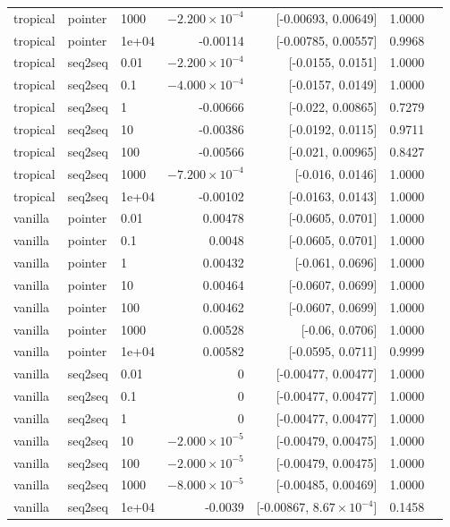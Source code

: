 \documentclass[10pt]{article}
\begin{document}
{\begin{longtable}{lllrrrl}
tropical & pointer & 1000 & $-2.200\times10^{-4}$ & [-0.00693, 0.00649] & 1.0000 & \\
tropical & pointer & 1e+04 & -0.00114 & [-0.00785, 0.00557] & 0.9968 & \\
tropical & seq2seq & 0.01 & $-2.200\times10^{-4}$ & [-0.0155, 0.0151] & 1.0000 & \\
tropical & seq2seq & 0.1 & $-4.000\times10^{-4}$ & [-0.0157, 0.0149] & 1.0000 & \\
tropical & seq2seq & 1 & -0.00666 & [-0.022, 0.00865] & 0.7279 & \\
tropical & seq2seq & 10 & -0.00386 & [-0.0192, 0.0115] & 0.9711 & \\
tropical & seq2seq & 100 & -0.00566 & [-0.021, 0.00965] & 0.8427 & \\
tropical & seq2seq & 1000 & $-7.200\times10^{-4}$ & [-0.016, 0.0146] & 1.0000 & \\
tropical & seq2seq & 1e+04 & -0.00102 & [-0.0163, 0.0143] & 1.0000 & \\
vanilla & pointer & 0.01 & 0.00478 & [-0.0605, 0.0701] & 1.0000 & \\
vanilla & pointer & 0.1 & 0.0048 & [-0.0605, 0.0701] & 1.0000 & \\
vanilla & pointer & 1 & 0.00432 & [-0.061, 0.0696] & 1.0000 & \\
vanilla & pointer & 10 & 0.00464 & [-0.0607, 0.0699] & 1.0000 & \\
vanilla & pointer & 100 & 0.00462 & [-0.0607, 0.0699] & 1.0000 & \\
vanilla & pointer & 1000 & 0.00528 & [-0.06, 0.0706] & 1.0000 & \\
vanilla & pointer & 1e+04 & 0.00582 & [-0.0595, 0.0711] & 0.9999 & \\
vanilla & seq2seq & 0.01 & 0 & [-0.00477, 0.00477] & 1.0000 & \\
vanilla & seq2seq & 0.1 & 0 & [-0.00477, 0.00477] & 1.0000 & \\
vanilla & seq2seq & 1 & 0 & [-0.00477, 0.00477] & 1.0000 & \\
vanilla & seq2seq & 10 & $-2.000\times10^{-5}$ & [-0.00479, 0.00475] & 1.0000 & \\
vanilla & seq2seq & 100 & $-2.000\times10^{-5}$ & [-0.00479, 0.00475] & 1.0000 & \\
vanilla & seq2seq & 1000 & $-8.000\times10^{-5}$ & [-0.00485, 0.00469] & 1.0000 & \\
vanilla & seq2seq & 1e+04 & -0.0039 & [-0.00867, $8.67\times10^{-4}$] & 0.1458 & \\
\bottomrule
\end{longtable}
}
\end{document}
